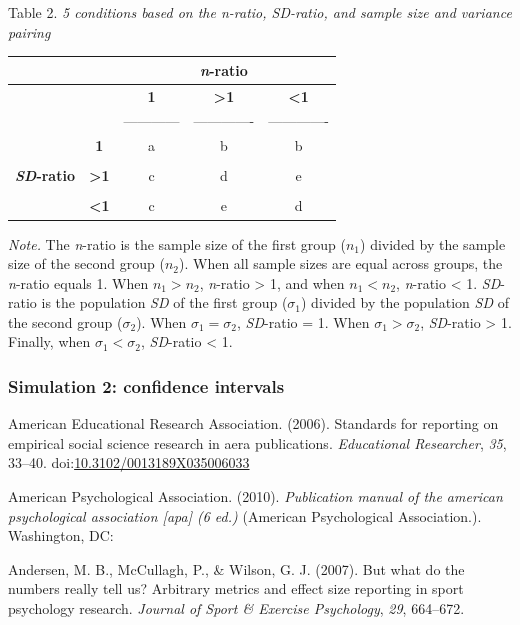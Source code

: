 \documentclass[
  man]{apa6}
\begin{document}
Table 2.
\emph{5 conditions based on the n-ratio, SD-ratio, and sample size and variance pairing}

\begin{longtable}[]{@{}ccccc@{}}
\toprule
& & & \textbf{\emph{n}-ratio} &\tabularnewline
\midrule
\endhead
& & \textbf{1} & \textbf{\textgreater1} & \textbf{\textless1}\tabularnewline
& & ------------ & ------------- & -------------\tabularnewline
& \textbf{1} & a & b & b\tabularnewline
& & & &\tabularnewline
\textbf{\emph{SD}-ratio} & \textbf{\textgreater1} & c & d & e\tabularnewline
& & & &\tabularnewline
& \textbf{\textless1} & c & e & d\tabularnewline
\bottomrule
\end{longtable}

\emph{Note.} The \emph{n}-ratio is the sample size of the first group (\(n_1\)) divided by the sample size of the second group (\(n_2\)). When all sample sizes are equal across groups, the \emph{n}-ratio equals 1. When \(n_1 > n_2\), \emph{n}-ratio \textgreater{} 1, and when \(n_1 < n_2\), \emph{n}-ratio \textless{} 1. \emph{SD}-ratio is the population \emph{SD} of the first group (\(\sigma_1\)) divided by the population \emph{SD} of the second group (\(\sigma_2\)). When \(\sigma_1=\sigma_2\), \emph{SD}-ratio = 1. When \(\sigma_1>\sigma_2\), \emph{SD}-ratio \textgreater{} 1. Finally, when \(\sigma_1<\sigma_2\), \emph{SD}-ratio \textless{} 1.

\hypertarget{simulation-2-confidence-intervals}{%
\subsubsection*{Simulation 2: confidence intervals}\label{simulation-2-confidence-intervals}}

\hypertarget{refs}{}
\leavevmode\hypertarget{ref-AERA_2006}{}%
American Educational Research Association. (2006). Standards for reporting on empirical social science research in aera publications. \emph{Educational Researcher}, \emph{35}, 33--40. doi:\href{https://doi.org/10.3102/0013189X035006033}{10.3102/0013189X035006033}

\leavevmode\hypertarget{ref-APA_2010}{}%
American Psychological Association. (2010). \emph{Publication manual of the american psychological association {[}apa{]} (6 ed.)} (American Psychological Association.). Washington, DC:

\leavevmode\hypertarget{ref-Andersen_et_al_2007}{}%
Andersen, M. B., McCullagh, P., \& Wilson, G. J. (2007). But what do the numbers really tell us? Arbitrary metrics and effect size reporting in sport psychology research. \emph{Journal of Sport \& Exercise Psychology}, \emph{29}, 664--672.
\end{document}

